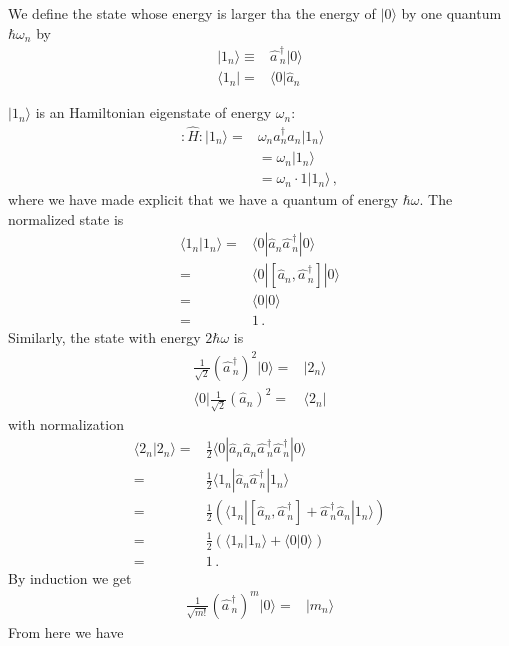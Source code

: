 \begin{frame}
We define the state whose energy is larger tha the energy of $|0\rangle$ by one quantum $\hbar\omega_n$ by
\begin{align}  
  |1_n\rangle\equiv&\widehat{a\,}_{n}^\dagger|0\rangle\nonumber\\ 
  \langle1_n|=&\langle0|\widehat{a}_{n}
\end{align}

$|1_n\rangle$ is an Hamiltonian eigenstate of energy $\omega_n$:
\begin{align}
  :\widehat{H}:|1_n\rangle =&\omega_n a_n^\dagger a_n |1_n\rangle \nonumber\\ 
&=\omega_n|1_n\rangle\nonumber\\
&=\omega_n\cdot 1|1_n\rangle\,,
\end{align}
where we have made explicit that we have a quantum of energy $\hbar\omega$. The normalized state is
\begin{align}
  \langle1_n|1_n\rangle=&\langle0|\widehat{a}_{n}\widehat{a\,}_{n}^\dagger|0\rangle\nonumber\\
  =&\langle0|\left[\widehat{a}_{n},\widehat{a\,}_{n}^\dagger\right]|0\rangle\nonumber\\
  =&\langle0|0\rangle\nonumber\\
  =&1\,.
\end{align}
Similarly, the state with energy $2\hbar\omega$ is
\begin{align}
\frac{1}{\sqrt{2}} \left(\widehat{a\,}_{n}^\dagger\right)^2 |0\rangle=&|2_n\rangle\nonumber\\
  \langle0|\frac{1}{\sqrt{2}}\left(\widehat{a}_{n}\right)^2=&\langle2_n|
\end{align}
with normalization
\begin{align}
  \langle2_n|2_n\rangle=&\frac{1}{2}\langle0|\widehat{a}_{n}\widehat{a}_{n}\widehat{a\,}_{n}^\dagger\widehat{a\,}_{n}^\dagger|0\rangle\nonumber\\
=&\frac{1}{2}\langle1_n|\widehat{a}_{n}\widehat{a\,}_{n}^\dagger|1_n\rangle\nonumber\\
=&\frac{1}{2}\left(\langle1_n|\left[\widehat{a}_{n},\widehat{a\,}_{n}^\dagger\right]+\widehat{a\,}_{n}^\dagger\widehat{a}_{n}|1_n\rangle\right)\nonumber\\
=&\frac{1}{2}\left(\langle1_n|1_n\rangle+\langle0|0\rangle\right)\nonumber\\
  =&1\,.
\end{align}
By induction we get
\begin{align}
\label{eq:sp}
\frac{1}{\sqrt{m!}} \left(\widehat{a\,}_{n}^\dagger\right)^m |0\rangle=&|m_n\rangle
\end{align}
From here we have 


\end{frame}
